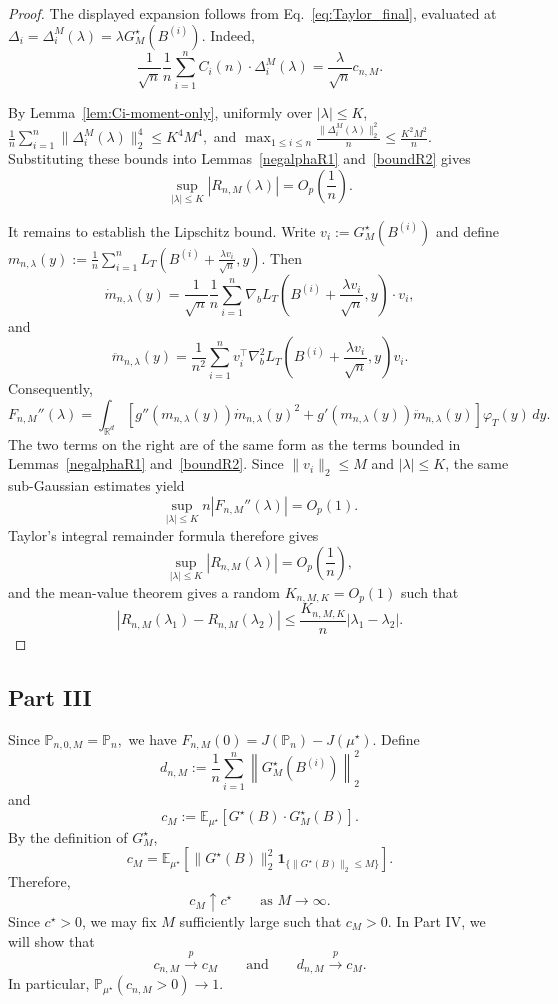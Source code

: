 \documentclass[11pt]{article}
\theoremstyle{definition}
\newcommand{\E}{\mathbb{E}}
\begin{document}
\begin{proof}
The displayed expansion follows from
Eq.~\eqref{eq:Taylor_final}, evaluated at $\Delta_i
=
\Delta_i^M(\lambda)
=
\lambda G_M^\star(B^{(i)}).$
Indeed,
\[
\frac1{\sqrt n}\frac1n
\sum_{i=1}^n
C_i(n)\cdot\Delta_i^M(\lambda)
=
\frac{\lambda}{\sqrt n}c_{n,M}.
\]

By Lemma~\ref{lem:Ci-moment-only}, uniformly over
$|\lambda|\leq K$, $\frac1n\sum_{i=1}^n
\|\Delta_i^M(\lambda)\|_2^4
\leq
K^4M^4,$
and $\max_{1\leq i\leq n}
\frac{\|\Delta_i^M(\lambda)\|_2^2}{n}
\leq
\frac{K^2M^2}{n}.$
Substituting these bounds into
Lemmas~\ref{negalphaR1} and~\ref{boundR2} gives
\[
\sup_{|\lambda|\leq K}
|R_{n,M}(\lambda)|
=
O_p\!\left(\frac1n\right).
\]

It remains to establish the Lipschitz bound. Write $v_i:=G_M^\star(B^{(i)})$ 
and define $m_{n,\lambda}(y)
:=
\frac1n
\sum_{i=1}^n
L_T\!\left(
B^{(i)}+\frac{\lambda v_i}{\sqrt n},
y
\right).$
Then
\[
\dot m_{n,\lambda}(y)
=
\frac1{\sqrt n}\frac1n
\sum_{i=1}^n
\nabla_bL_T\!\left(
B^{(i)}+\frac{\lambda v_i}{\sqrt n},
y
\right)\cdot v_i,
\]
and
\[
\ddot m_{n,\lambda}(y)
=
\frac1{n^2}
\sum_{i=1}^n
v_i^\top
\nabla_b^2L_T\!\left(
B^{(i)}+\frac{\lambda v_i}{\sqrt n},
y
\right)
v_i.
\]
Consequently,
\[
F_{n,M}''(\lambda)
=
\int_{\mathbb R^d}
\left[
g''\!\left(m_{n,\lambda}(y)\right)
\dot m_{n,\lambda}(y)^2
+
g'\!\left(m_{n,\lambda}(y)\right)
\ddot m_{n,\lambda}(y)
\right]
\varphi_T(y)\,dy.
\]
The two terms on the right are of the same form as the terms bounded
in Lemmas~\ref{negalphaR1} and~\ref{boundR2}. Since $\|v_i\|_2\leq M$
and $|\lambda|\leq K$, the same sub-Gaussian estimates yield
\[
\sup_{|\lambda|\leq K}
n|F_{n,M}''(\lambda)|
=
O_p(1).
\]
Taylor's integral remainder formula therefore gives
\[
\sup_{|\lambda|\leq K}
|R_{n,M}(\lambda)|
=
O_p\!\left(\frac1n\right),
\]
and the mean-value theorem gives a random
$K_{n,M,K}=O_p(1)$ such that
\[
|R_{n,M}(\lambda_1)-R_{n,M}(\lambda_2)|
\leq
\frac{K_{n,M,K}}{n}
|\lambda_1-\lambda_2|.
\]
\end{proof}

\subsection{Part III}

Since $\mathbb P_{n,0,M}=\mathbb P_n,$
we have $F_{n,M}(0)
=
J(\mathbb P_n)-J(\mu^\star).$
Define
\[
d_{n,M}
:=
\frac1n
\sum_{i=1}^n
\left\|
G_M^\star(B^{(i)})
\right\|_2^2
\]
and
\[
c_M
:=
\E_{\mu^\star}
\left[
G^\star(B)\cdot G_M^\star(B)
\right].
\]
By the definition of $G_M^\star$,
\[
c_M
=
\E_{\mu^\star}
\left[
\|G^\star(B)\|_2^2
\mathbf 1_{\{\|G^\star(B)\|_2\leq M\}}
\right].
\]
Therefore,
\[
c_M\uparrow c^\star
\qquad
\text{as }M\to\infty.
\]
Since $c^\star>0$, we may fix $M$ sufficiently large such that $c_M>0.$
In Part IV, we will show that
\[
c_{n,M}\xrightarrow{p}c_M
\qquad\text{and}\qquad
d_{n,M}\xrightarrow{p}c_M.
\]
In particular, $\mathbb P_{\mu^\star}(c_{n,M}>0)\longrightarrow1.$
\end{document}
